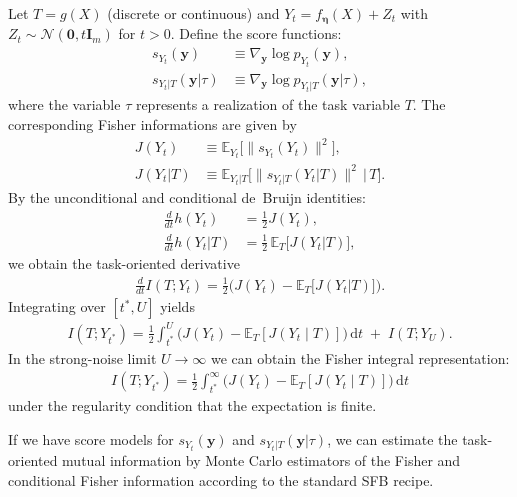 \documentclass[conference]{IEEEtran}
\newtheorem{remark}{Remark}
\newcommand{\E}{\mathbb{E}}
\begin{document}
Let $T=g(X)$ (discrete or continuous) and 
$Y_t=f_{\bm\eta}(X)+Z_t$ with $Z_t\sim\mathcal N(\bm 0, t \bm I_m)$ for $t>0$.
Define the score functions:
\begin{align}
s_{Y_t}(\bm y) &\equiv \nabla_{\bm y}\log p_{Y_t}(\bm y), \\
s_{Y_t| T}(\bm y| \tau ) &\equiv \nabla_{\bm y}\log p_{Y_t| T}(\bm y |\tau),
\end{align}
where the variable $\tau$ represents a realization of the task variable $T$.
The corresponding Fisher informations are given by
\begin{align}
J(Y_t) &\equiv \E_{Y_t}\!\big[\|s_{Y_t}(Y_t)\|^2\big], \\
J(Y_t |T) &\equiv \E_{Y_t |T}\!\big[\|s_{Y_t | T}(Y_t| T)\|^2\,\big|\,T\big].
\end{align}
By the unconditional and conditional de~Bruijn identities:
\begin{align}
\frac{d}{dt} h(Y_t) &=\frac12 J(Y_t), \\
\frac{d}{dt} h(Y_t| T) &=\frac12\,\E_T\!\big[J(Y_t| T)\big],
\end{align}
we obtain the task-oriented derivative
\begin{align}
\frac{d}{dt}I(T;Y_t)
= \frac12\Big(J(Y_t)-\E_T\!\big[J(Y_t | T)\big]\Big).
\label{eq:sfb-task-diff}
\end{align}
Integrating over $[t^*,U]$ yields
\begin{align}
I(T;Y_{t^*})
= \frac12 \int_{t^*}^{U}\!\Big(J(Y_t) - \E_T[J(Y_t\mid T)]\Big)\,\mathrm dt
\;+\; I(T;Y_U).
\label{eq:sfb-task-int-U}
\end{align}
In the strong-noise limit $U\to\infty$ 
we can obtain the Fisher integral representation:
\begin{align}
I(T;Y_{t^*})
= \frac12 \int_{t^*}^{\infty}\!\Big(J(Y_t) - \E_T[J(Y_t\mid T)]\Big)\,\mathrm dt
\label{eq:sfb-task-int}
\end{align}
under the regularity condition that the expectation is finite.

If we have score models for $s_{Y_t}(\bm y)$ and $s_{Y_t|T}(\bm y|\tau)$, 
we can estimate the task-oriented mutual information by Monte Carlo estimators of 
the Fisher and conditional Fisher information
according to the standard SFB recipe.

\end{document}
